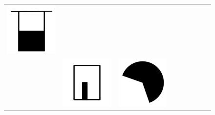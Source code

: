 \documentclass[doc]{apa6}
\newcommand{\stimulusscale}{.1}
\begin{document}
\begin{figure}[t]
\begin{center}
\begin{tabular}{c|cccccccc}
\includegraphics[scale=\stimulusscale]{./set20stim55.png} \\[6pt]
 \raisebox{.75cm}{75}  &
\includegraphics[scale=\stimulusscale]{./set13stim75.png} &
\includegraphics[scale=\stimulusscale]{./set14stim75.png} &

\end{tabular}
\end{center}
\end{figure}
\end{document}
